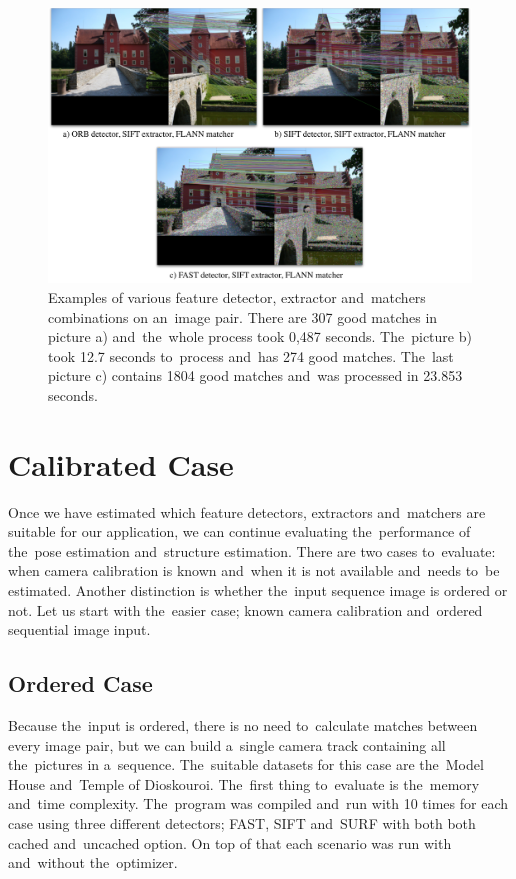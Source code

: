 \begin{figure}[!htbp]
	\begin{center}
		\includegraphics[keepaspectratio,width=\textwidth]{fig/matches.pdf}
	\end{center}
	\caption{Examples of various feature detector, extractor and~matchers combinations on an~image pair. There are 307 good matches in picture a) and~the~whole process took 0,487 seconds. The~picture b) took 12.7 seconds to~process and~has 274 good matches. The~last picture c) contains 1804 good matches and~was processed in 23.853 seconds.}
	\label{fig:matches}
\end{figure}


\section{Calibrated Case}
\label{sec:experiments-calibrated}
Once we have estimated which feature detectors, extractors and~matchers are suitable for our application, we can continue evaluating the~performance of the~pose estimation and~structure estimation. There are two cases to~evaluate: when camera calibration is known and~when it is not available and~needs to~be estimated.  Another distinction is whether the~input sequence image is ordered or not. Let us start with the~easier case; known camera calibration and~ordered sequential image input.

\subsection*{Ordered Case}
\label{sub:ordered_case}
Because the~input is ordered, there is no need to~calculate matches between every image pair, but we can build a~single camera track containing all the~pictures in a~sequence. The~suitable datasets for this case are the~Model House and~Temple of Dioskouroi. The~first thing to~evaluate is the~memory and~time complexity. The~program was compiled and~run with 10 times for each case using three different detectors; FAST, SIFT and~SURF with both both cached and~uncached option. On top of that each scenario was run with and~without the~optimizer. 

